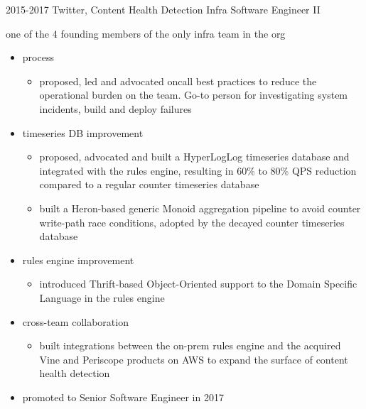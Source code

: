 \documentclass[]{friggeri-cv-a4}
\begin{document}
\begin{entrylist}
  \entry
  {2015-2017}
  {Twitter, Content Health Detection Infra}
  {Software Engineer II}
  {
    one of the 4 founding members of the only infra team in the org
    \begin{itemize}
    \item process
      \begin{itemize}
      \item proposed, led and advocated oncall best practices to reduce the operational burden on the team. Go-to person for investigating system incidents, build and deploy failures
      \end{itemize}
    \item timeseries DB improvement
      \begin{itemize}
      \item proposed, advocated and built a HyperLogLog timeseries database and integrated with the rules engine, resulting in 60\% to 80\% QPS reduction compared to a regular counter timeseries database
      \item built a Heron-based generic Monoid aggregation pipeline to avoid counter write-path race conditions, adopted by the decayed counter timeseries database
      \end{itemize}
    \item rules engine improvement
      \begin{itemize}
      \item introduced Thrift-based Object-Oriented support to the Domain Specific Language in the rules engine
      \end{itemize}
    \item cross-team collaboration
      \begin{itemize}
      \item built integrations between the on-prem rules engine and the acquired Vine and Periscope products on AWS to expand the surface of content health detection
      \end{itemize}
    \item promoted to Senior Software Engineer in 2017
    \end{itemize}
  }
\end{entrylist}
\end{document}
